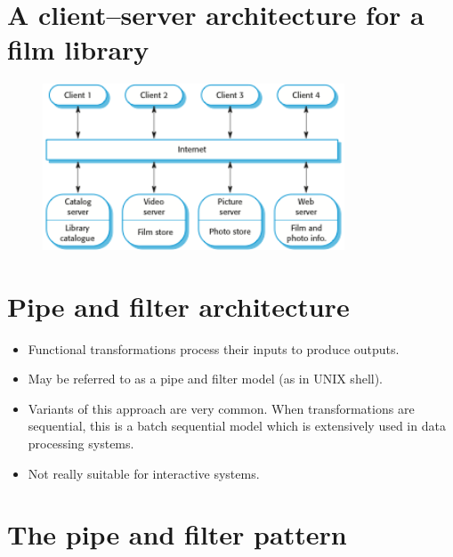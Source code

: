 \section{A client–server architecture for a film library}
\begin{figure}[h!]
    \centering
    \includegraphics[width = 0.8\textwidth]{./figures/L3_7.png}
    \caption{}
    \label{fig:L3_7}
\end{figure}

\section{Pipe and filter architecture}
\begin{itemize}
\item Functional transformations process their inputs to produce outputs.

\item May be referred to as a pipe and filter model (as in UNIX shell).

\item Variants of this approach are very common. When transformations are sequential, this is a batch sequential model which is extensively used in data processing systems.

\item Not really suitable for interactive systems.
\end{itemize}

\newpage
\section{The pipe and filter pattern}

